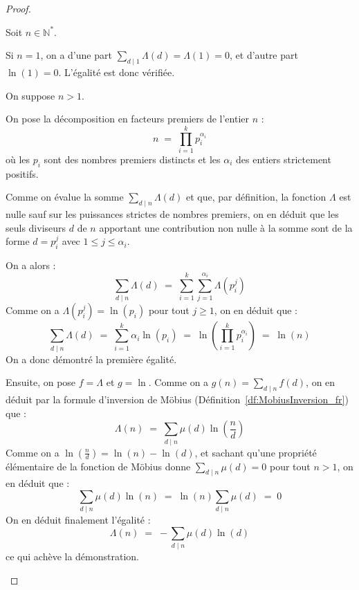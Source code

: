 \documentclass[Riemann_Hypothesis.tex]{subfiles}
\begin{document}
\begin{proof}
    \begin{part_proof}
        Soit $n \in \mathbb{N}^*$. \par
        Si $n=1$, on a d'une part $\sum_{d \mid 1} \Lambda(d) = \Lambda(1) = 0$, et d'autre part $\ln(1) = 0$. L'égalité est donc vérifiée. \par
        On suppose $n > 1$. \par
        On pose la décomposition en facteurs premiers de l'entier $n$ :
        \begin{equation*}
            n \;=\; \prod_{i=1}^{k} p_i^{\alpha_i}
        \end{equation*}
        où les $p_i$ sont des nombres premiers distincts et les $\alpha_i$
        des entiers strictement positifs. \medskip\par
        Comme on évalue la somme $\sum_{d \mid n} \Lambda(d)$ et que, par définition, la fonction $\Lambda$ est nulle sauf sur les puissances strictes de nombres premiers, on en déduit que les seuls diviseurs $d$ de $n$ apportant une contribution non nulle à la somme sont de la forme $d = p_i^j$ avec $1 \leq j \leq \alpha_i$. \par
        On a alors :
        \begin{equation*}
            \sum_{d \mid n} \Lambda(d) \;=\; \sum_{i=1}^{k} \sum_{j=1}^{\alpha_i} \Lambda\left(p_i^j\right)
        \end{equation*}
        Comme on a $\Lambda(p_i^j) = \ln(p_i)$ pour tout $j \geq 1$, on en déduit que :
        \begin{equation*}
            \sum_{d \mid n} \Lambda(d) \;=\; \sum_{i=1}^{k} \alpha_i \ln(p_i) \;=\; \ln\left( \prod_{i=1}^{k} p_i^{\alpha_i} \right) \;=\; \ln(n)
        \end{equation*}
        On a donc démontré la première égalité. \par
        Ensuite, on pose $f = \Lambda$ et $g = \ln$. 
        Comme on a $g(n) = \sum_{d \mid n} f(d)$, on en déduit par la formule 
        d'inversion de Möbius (Définition~\ref{df:MobiusInversion_fr}) que :
        \begin{equation*}
            \Lambda(n) \;=\; \sum_{d \mid n} \mu(d) \ln\left(\frac{n}{d}\right)
        \end{equation*}
        Comme on a $\ln\left(\frac{n}{d}\right) = \ln(n) - \ln(d)$, et sachant qu'une propriété élémentaire de la fonction de Möbius donne $\sum_{d \mid n} \mu(d) = 0$ pour tout $n > 1$, on en déduit que :
        \begin{equation*}
            \sum_{d \mid n} \mu(d) \ln(n) \;=\; \ln(n) \sum_{d \mid n} \mu(d) \;=\; 0
        \end{equation*}
        On en déduit finalement l'égalité :
        \begin{equation*}
            \Lambda(n) \;=\; -\sum_{d \mid n} \mu(d) \ln(d)
        \end{equation*}
        ce qui achève la démonstration.
    \end{part_proof}
\end{proof}
\end{document}
